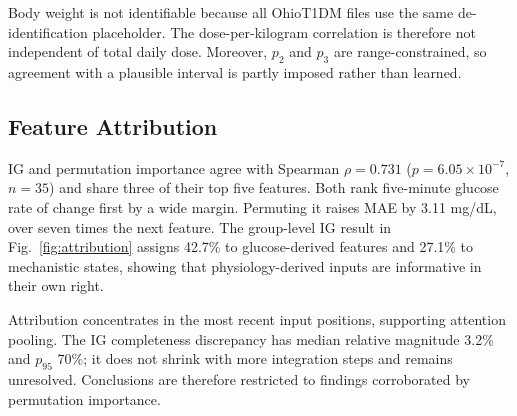 \documentclass[journal]{IEEEtran}
\begin{document}
Body weight is not identifiable because all OhioT1DM files use the same de-identification placeholder. The dose-per-kilogram correlation is therefore not independent of total daily dose. Moreover, $p_2$ and $p_3$ are range-constrained, so agreement with a plausible interval is partly imposed rather than learned.

\subsection{Feature Attribution}
\label{sec:attribution}

IG and permutation importance agree with Spearman $\rho = 0.731$ ($p = 6.05 \times 10^{-7}$, $n=35$) and share three of their top five features. Both rank five-minute glucose rate of change first by a wide margin. Permuting it raises MAE by 3.11 mg/dL, over seven times the next feature. The group-level IG result in Fig.~\ref{fig:attribution} assigns 42.7\% to glucose-derived features and 27.1\% to mechanistic states, showing that physiology-derived inputs are informative in their own right.

Attribution concentrates in the most recent input positions, supporting attention pooling. The IG completeness discrepancy has median relative magnitude 3.2\% and $p_{95}$ 70\%; it does not shrink with more integration steps and remains unresolved. Conclusions are therefore restricted to findings corroborated by permutation importance.

\igtable
{}\of\igtable \global\let\igGlu=\pgfplotsretval
{}\of\igtable \global\let\igMech=\pgfplotsretval
{}\of\igtable \global\let\igTher=\pgfplotsretval
{}\of\igtable \global\let\igTime=\pgfplotsretval
{}\of\igtable \global\let\igSens=\pgfplotsretval
{}\of\igtable \global\let\igCtx=\pgfplotsretval
{}\pitable
\of\pitable \global\let\pmA=\pgfplotsretval %
\of\pitable \global\let\pmB=\pgfplotsretval %
\of\pitable \global\let\pmC=\pgfplotsretval %
\of\pitable \global\let\pmD=\pgfplotsretval %
\of\pitable \global\let\pmE=\pgfplotsretval %
\of\pitable \global\let\pmF=\pgfplotsretval %
\of\pitable \global\let\pmG=\pgfplotsretval %
\of\pitable \global\let\pmH=\pgfplotsretval %
\of\pitable \global\let\pmI=\pgfplotsretval %
\end{document}
